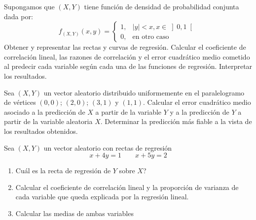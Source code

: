 \begin{ejercicio}
    Supongamos que $(X,Y)$ tiene función de densidad de probabilidad conjunta dada por:
    \begin{equation*}
        f_{(X,Y)}(x, y) = \begin{cases}
            1, & |y| < x, x \in \left]0,1\right[\\
            0, & \text{en otro caso}
        \end{cases}
    \end{equation*}
    Obtener y representar las rectas y curvas de regresión. Calcular el coeficiente de correlación lineal, las razones de correlación y el error cuadrático medio cometido al predecir cada variable según cada una de las funciones de regresión. Interpretar los resultados.
\end{ejercicio}

\begin{ejercicio}
    Sea $(X,Y)$ un vector aleatorio distribuido uniformemente en el paralelogramo de vértices $(0,0)$; $(2,0)$; $(3,1)$ y $(1,1)$. Calcular el error cuadrático medio asociado a la predicción de $X$ a partir de la variable $Y$ y a la predicción de $Y$ a partir de la variable aleatoria $X$. Determinar la predicción más fiable a la vista de los resultados obtenidos.
\end{ejercicio}

\begin{ejercicio}
    Sea $(X,Y)$ un vector aleatorio con rectas de regresión
    \begin{equation*}
        x+4y = 1 \qquad x+5y = 2
    \end{equation*}
    \begin{enumerate}
        \item Cuál es la recta de regresión de $Y$ sobre $X$?
        \item Calcular el coeficiente de correlación lineal y la proporción de varianza de cada variable que queda explicada por la regresión lineal.
        \item Calcular las medias de ambas variables
    \end{enumerate}
\end{ejercicio}